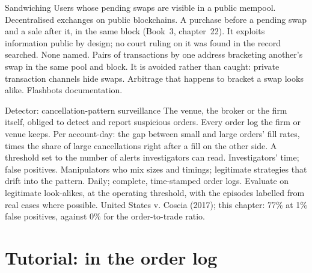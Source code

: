 \begin{strategyfile}{Sandwiching}\label{strat:s2:manipulative-strategies-and-how-they-are-caught:sandwich}
 Users whose pending swaps are visible in a public mempool.
 Decentralised exchanges on public blockchains.
 A purchase before a pending swap and a sale after it, in the same block (Book~3, chapter~22).
 It exploits information public by design; no court ruling on it was found in the record searched.
 None named.
 Pairs of transactions by one address bracketing another's swap in the same pool and block.
 It is avoided rather than caught: private transaction channels hide swaps.
 Arbitrage that happens to bracket a swap looks alike.
 Flashbots documentation.
\end{strategyfile}

\begin{strategyfile}{Detector: cancellation-pattern surveillance}\label{strat:s2:manipulative-strategies-and-how-they-are-caught:detector}
 The venue, the broker or the firm itself, obliged to detect and report suspicious orders.
 Every order log the firm or venue keeps.
 Per account-day: the gap between small and large orders' fill rates, times the share of large cancellations right after a fill on the
other side.
 A threshold set to the number of alerts investigators can read.
 Investigators' time; false positives.
 Manipulators who mix sizes and timings; legitimate strategies that drift into the pattern.
 Daily; complete, time-stamped order logs.
 Evaluate on legitimate look-alikes, at the operating threshold, with the episodes labelled from real cases where possible.
 United States v. Coscia (2017); this chapter: 77\% at 1\% false positives, against 0\% for the order-to-trade ratio.
\end{strategyfile}

\section{Tutorial: in the order log}\label{tut:s2:manipulative-strategies-and-how-they-are-caught:tut}

